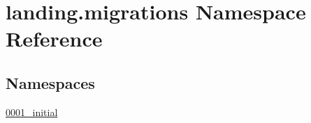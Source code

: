 \hypertarget{namespacelanding_1_1migrations}{}\section{landing.\+migrations Namespace Reference}
\label{namespacelanding_1_1migrations}
\subsection*{Namespaces}
\begin{DoxyCompactItemize}
\item 
 \mbox{\hyperlink{namespacelanding_1_1migrations_1_10001__initial}{0001\+\_\+initial}}
\end{DoxyCompactItemize}
